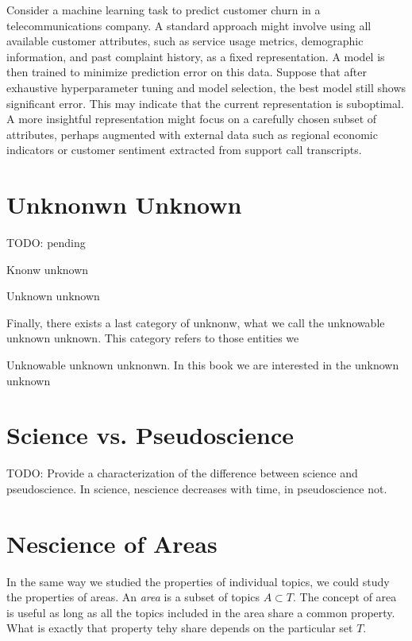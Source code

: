 \begin{example}
Consider a machine learning task to predict customer churn in a telecommunications company. A standard approach might involve using all available customer attributes, such as service usage metrics, demographic information, and past complaint history, as a fixed representation. A model is then trained to minimize prediction error on this data. Suppose that after exhaustive hyperparameter tuning and model selection, the best model still shows significant error. This may indicate that the current representation is suboptimal. A more insightful representation might focus on a carefully chosen subset of attributes, perhaps augmented with external data such as regional economic indicators or customer sentiment extracted from support call transcripts.
\end{example}

%
%

\section{Unknonwn Unknown}

{\color{red} TODO: pending}

Knonw unknown

Unknown unknown

Finally, there exists a last category of unknonw, what we call the unknowable unknown unknown. This category refers to those entities we

Unknowable unknown unknonwn. In this book we are interested in the unknown unknown

%
%

\section{Science vs. Pseudoscience}

{\color{red} TODO: Provide a characterization of the difference between science and pseudoscience. In science, nescience decreases with time, in pseudoscience not.}

%
%

\section{Nescience of Areas}
\label{sec:nescience_areas}

In the same way we studied the properties of individual topics, we could study the properties of areas. An \emph{area} is a subset of topics $A\subset T$. The concept of area is useful as long as all the topics included in the area share a common property. What is exactly that property tehy share depends on the particular set $T$.

